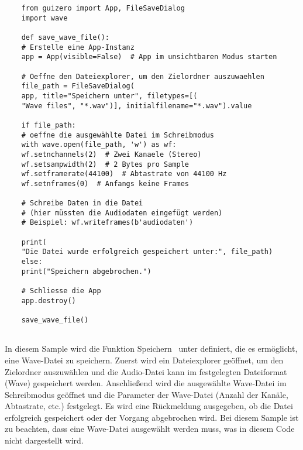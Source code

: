 \begin{verbatim}
    from guizero import App, FileSaveDialog
    import wave
    
    def save_wave_file():
    # Erstelle eine App-Instanz
    app = App(visible=False)  # App im unsichtbaren Modus starten
    
    # Oeffne den Dateiexplorer, um den Zielordner auszuwaehlen
    file_path = FileSaveDialog(
    app, title="Speichern unter", filetypes=[(
    "Wave files", "*.wav")], initialfilename="*.wav").value
    
    if file_path:
    # oeffne die ausgewählte Datei im Schreibmodus
    with wave.open(file_path, 'w') as wf:
    wf.setnchannels(2)  # Zwei Kanaele (Stereo)
    wf.setsampwidth(2)  # 2 Bytes pro Sample
    wf.setframerate(44100)  # Abtastrate von 44100 Hz
    wf.setnframes(0)  # Anfangs keine Frames
    
    # Schreibe Daten in die Datei 
    # (hier müssten die Audiodaten eingefügt werden)
    # Beispiel: wf.writeframes(b'audiodaten')
    
    print(
    "Die Datei wurde erfolgreich gespeichert unter:", file_path)
    else:
    print("Speichern abgebrochen.")
    
    # Schliesse die App
    app.destroy()
    
    save_wave_file()
    
\end{verbatim}

In diesem Sample wird die Funktion \glqq Speichern\grqq~ unter definiert, die es ermöglicht, eine Wave-Datei zu speichern. Zuerst wird ein Dateiexplorer geöffnet, um den Zielordner auszuwählen und die Audio-Datei kann im festgelegten Dateiformat (Wave) gespeichert werden. Anschließend wird die ausgewählte Wave-Datei im Schreibmodus geöffnet und die Parameter der Wave-Datei (Anzahl der Kanäle, Abtastrate, etc.) festgelegt. Es wird eine Rückmeldung ausgegeben, ob die Datei erfolgreich gespeichert oder der Vorgang abgebrochen wird. Bei diesem Sample ist zu beachten, dass eine Wave-Datei ausgewählt werden muss, was in diesem Code nicht dargestellt wird.

